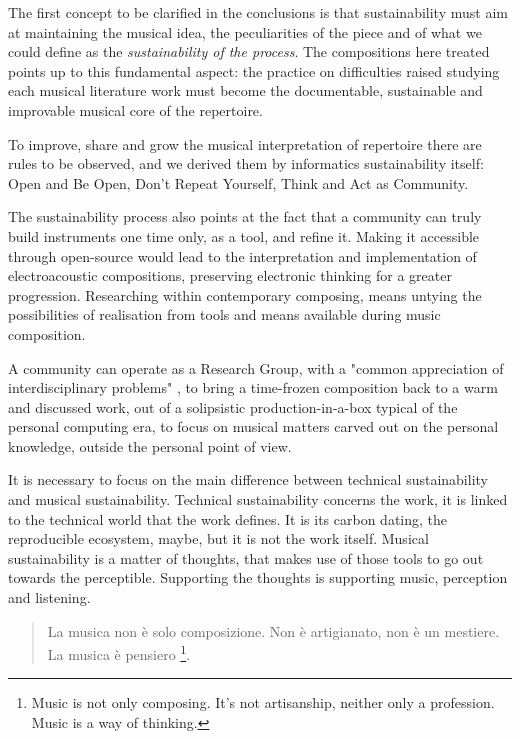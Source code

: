 \documentclass[twoside,a4paper]{article}
\begin{document}
The first concept to be clarified in the conclusions is that sustainability must aim at maintaining the musical idea, the peculiarities of the piece and of what we could define as the \emph{sustainability of the process}. The compositions here treated points up to this fundamental aspect: the practice on difficulties raised studying each musical literature work must become the documentable, sustainable and improvable musical core of the repertoire.

To improve, share and grow the musical interpretation of repertoire there are rules to be observed, and we derived them by informatics sustainability itself: Open and Be Open, Don't Repeat Yourself, Think and Act as Community.

The sustainability process also points at the fact that a community can truly build instruments one time only, as a tool, and refine it. Making it accessible through open-source would lead to the interpretation and implementation of electroacoustic compositions, preserving electronic thinking for a greater progression. Researching within contemporary composing, means untying the possibilities of realisation from tools and means available during music composition.

A community can operate as a Research Group, with a "common appreciation of interdisciplinary problems" \cite{ml91}, to bring a time-frozen composition back to a warm and discussed work, out of a solipsistic production-in-a-box typical of the personal computing era, to focus on musical matters carved out on the personal knowledge, outside the personal point of view. 

It is necessary to focus on the main difference between technical sustainability and musical sustainability. Technical sustainability concerns the work, it is linked to the technical world that the work defines. It is its carbon dating, the reproducible ecosystem, maybe, but it is not the work itself. Musical sustainability is a matter of thoughts, that makes use of those tools to go out towards the perceptible. Supporting the thoughts is supporting music, perception and listening.

\begin{quote}
La musica non è solo composizione. Non è artigianato, non è un mestiere. La musica è pensiero \cite{nono85}\footnote{Music is not only composing. It’s not artisanship, neither only a profession. Music is a way of thinking.}.
\end{quote}
%
\end{document}
